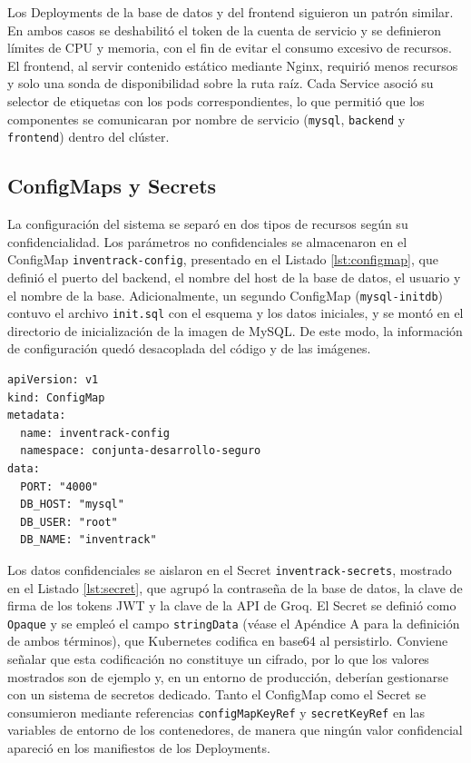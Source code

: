 \documentclass[stu,11pt,spanish,floatsintext]{apa7}
\begin{document}
Los Deployments de la base de datos y del frontend siguieron un patrón similar. En ambos casos se deshabilitó el token de la cuenta de servicio y se definieron límites de CPU y memoria, con el fin de evitar el consumo excesivo de recursos. El frontend, al servir contenido estático mediante Nginx, requirió menos recursos y solo una sonda de disponibilidad sobre la ruta raíz. Cada Service asoció su selector de etiquetas con los pods correspondientes, lo que permitió que los componentes se comunicaran por nombre de servicio (\texttt{mysql}, \texttt{backend} y \texttt{frontend}) dentro del clúster.

\subsection{ConfigMaps y Secrets}

La configuración del sistema se separó en dos tipos de recursos según su confidencialidad. Los parámetros no confidenciales se almacenaron en el ConfigMap \texttt{inventrack-config}, presentado en el Listado \ref{lst:configmap}, que definió el puerto del backend, el nombre del host de la base de datos, el usuario y el nombre de la base. Adicionalmente, un segundo ConfigMap (\texttt{mysql-initdb}) contuvo el archivo \texttt{init.sql} con el esquema y los datos iniciales, y se montó en el directorio de inicialización de la imagen de MySQL. De este modo, la información de configuración quedó desacoplada del código y de las imágenes.

\begin{lstlisting}[caption={ConfigMap de configuración (02-configmap.yaml)},label=lst:configmap]
apiVersion: v1
kind: ConfigMap
metadata:
  name: inventrack-config
  namespace: conjunta-desarrollo-seguro
data:
  PORT: "4000"
  DB_HOST: "mysql"
  DB_USER: "root"
  DB_NAME: "inventrack"
\end{lstlisting}

Los datos confidenciales se aislaron en el Secret \texttt{inventrack-secrets}, mostrado en el Listado \ref{lst:secret}, que agrupó la contraseña de la base de datos, la clave de firma de los tokens JWT y la clave de la API de Groq. El Secret se definió como \texttt{Opaque} y se empleó el campo \texttt{stringData} (véase el Apéndice A para la definición de ambos términos), que Kubernetes codifica en base64 al persistirlo. Conviene señalar que esta codificación no constituye un cifrado, por lo que los valores mostrados son de ejemplo y, en un entorno de producción, deberían gestionarse con un sistema de secretos dedicado. Tanto el ConfigMap como el Secret se consumieron mediante referencias \texttt{configMapKeyRef} y \texttt{secretKeyRef} en las variables de entorno de los contenedores, de manera que ningún valor confidencial apareció en los manifiestos de los Deployments.
\end{document}
